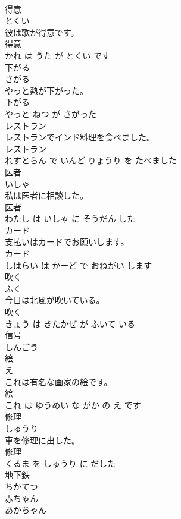 \documentclass[8pt]{extreport}
\begin{document}
\begin{CJK}{UTF8}{min}
\\	得意	
\\	とくい			
\\	彼は歌が得意です。	
\\	得意 
\\	かれ は うた が とくい です			
\\	下がる	
\\	さがる			
\\	やっと熱が下がった。	
\\	下がる 
\\	やっと ねつ が さがった			
\\	レストラン	
\\	レストランでインド料理を食べました。	
\\	レストラン 
\\	れすとらん で いんど りょうり を たべました			
\\	医者	
\\	いしゃ			
\\	私は医者に相談した。	
\\	医者 
\\	わたし は いしゃ に そうだん した			
\\	カード	
\\	支払いはカードでお願いします。	
\\	カード 
\\	しはらい は かーど で おねがい します			
\\	吹く	
\\	ふく			
\\	今日は北風が吹いている。	
\\	吹く 
\\	きょう は きたかぜ が ふいて いる			
\\	信号	
\\	しんごう			
\\	絵	
\\	え			
\\	これは有名な画家の絵です。	
\\	絵 
\\	これ は ゆうめい な がか の え です			
\\	修理	
\\	しゅうり			
\\	車を修理に出した。	
\\	修理 
\\	くるま を しゅうり に だした			
\\	地下鉄	
\\	ちかてつ			
\\	赤ちゃん	
\\	あかちゃん			

\end{CJK}
\end{document}
